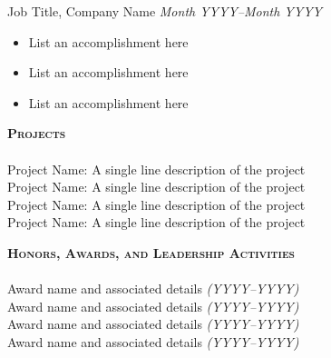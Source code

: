 \documentclass[11 pt]{article}
\newcommand{\sbt}{\,\begin{picture}(-1,1)(-1,-3)\circle*{2.5}\end{picture}\ }
\newcommand{\lineunder}{\vspace*{-8pt} \\ \hspace*{-18pt} \hrulefill \\}
\newcommand{\header}[1]{{\hspace*{-15pt}\vspace*{6pt}  \textsc{#1}} \vspace*{-6pt} \lineunder }
\begin{document}
Job Title, Company Name \hfill \emph{Month YYYY--Month YYYY}\\
\begin{itemize}
\item[\sbt] List an accomplishment here
\item[\sbt] List an accomplishment here
\item[\sbt] List an accomplishment here
\end{itemize}

\vspace{5pt}
\header{\textbf{Projects}}

\vspace{1pt}
Project Name: A single line description of the project \\
Project Name: A single line description of the project \\
Project Name: A single line description of the project \\
Project Name: A single line description of the project \\

\vspace{5pt}

\header{\textbf{Honors, Awards, and Leadership Activities}}
Award name and associated details \emph{(YYYY--YYYY)} \\
Award name and associated details \emph{(YYYY--YYYY)} \\
Award name and associated details \emph{(YYYY--YYYY)} \\
Award name and associated details \emph{(YYYY--YYYY)} \\
\end{document}
